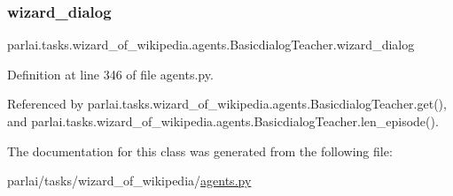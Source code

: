 \mbox{\label{classparlai_1_1tasks_1_1wizard__of__wikipedia_1_1agents_1_1BasicdialogTeacher_a696c74de1866ac0f243d59c603ecaae9}} 
\subsubsection{\texorpdfstring{wizard\+\_\+dialog}{wizard\_dialog}}
{\footnotesize\ttfamily parlai.\+tasks.\+wizard\+\_\+of\+\_\+wikipedia.\+agents.\+Basicdialog\+Teacher.\+wizard\+\_\+dialog}



Definition at line 346 of file agents.\+py.



Referenced by parlai.\+tasks.\+wizard\+\_\+of\+\_\+wikipedia.\+agents.\+Basicdialog\+Teacher.\+get(), and parlai.\+tasks.\+wizard\+\_\+of\+\_\+wikipedia.\+agents.\+Basicdialog\+Teacher.\+len\+\_\+episode().



The documentation for this class was generated from the following file\+:\begin{DoxyCompactItemize}
\item 
parlai/tasks/wizard\+\_\+of\+\_\+wikipedia/\hyperlink{parlai_2tasks_2wizard__of__wikipedia_2agents_8py}{agents.\+py}\end{DoxyCompactItemize}
